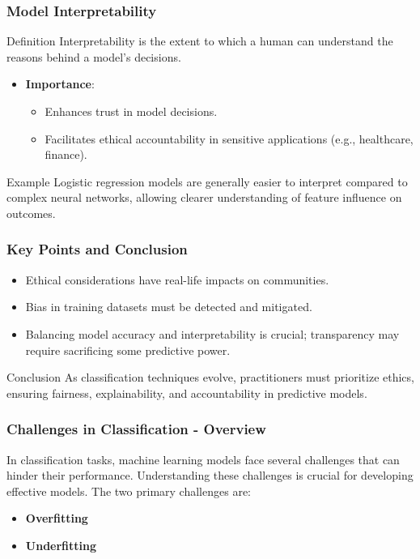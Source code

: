 \documentclass[aspectratio=169]{beamer}
\begin{document}
\begin{frame}[fragile]
  \frametitle{Model Interpretability}
  \begin{block}{Definition}
    Interpretability is the extent to which a human can understand the reasons behind a model's decisions.
  \end{block}
  
  \begin{itemize}
    \item \textbf{Importance}:
    \begin{itemize}
      \item Enhances trust in model decisions.
      \item Facilitates ethical accountability in sensitive applications (e.g., healthcare, finance).
    \end{itemize}
  \end{itemize}
  
  \begin{block}{Example}
    Logistic regression models are generally easier to interpret compared to complex neural networks, allowing clearer understanding of feature influence on outcomes.
  \end{block}
\end{frame}

\begin{frame}[fragile]
  \frametitle{Key Points and Conclusion}
  \begin{itemize}
    \item Ethical considerations have real-life impacts on communities.
    \item Bias in training datasets must be detected and mitigated.
    \item Balancing model accuracy and interpretability is crucial; transparency may require sacrificing some predictive power.
  \end{itemize}
  
  \begin{block}{Conclusion}
    As classification techniques evolve, practitioners must prioritize ethics, ensuring fairness, explainability, and accountability in predictive models.
  \end{block}
\end{frame}

\begin{frame}[fragile]
    \frametitle{Challenges in Classification - Overview}
    In classification tasks, machine learning models face several challenges that can hinder their performance. Understanding these challenges is crucial for developing effective models. The two primary challenges are:
    \begin{itemize}
        \item \textbf{Overfitting}
        \item \textbf{Underfitting}
    \end{itemize}
\end{frame}
\end{document}
